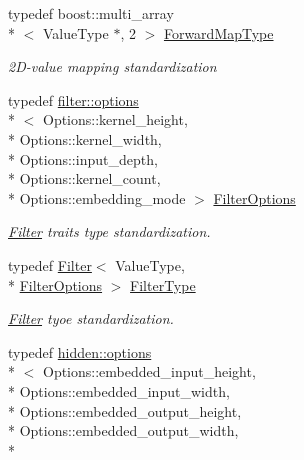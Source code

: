 \begin{DoxyCompactItemize}
\item 
typedef boost\-::multi\-\_\-array\\*
$<$ Value\-Type $\ast$, 2 $>$ \hyperlink{structffnn_1_1layer_1_1convolution_1_1extrinsics_abda7b16eb793b1b130063d51ef701296}{Forward\-Map\-Type}
\begin{DoxyCompactList}\small\item\em 2\-D-\/value mapping standardization \end{DoxyCompactList}\item 
typedef \hyperlink{structffnn_1_1layer_1_1convolution_1_1filter_1_1options}{filter\-::options}\\*
$<$ Options\-::kernel\-\_\-height, \\*
Options\-::kernel\-\_\-width, \\*
Options\-::input\-\_\-depth, \\*
Options\-::kernel\-\_\-count, \\*
Options\-::embedding\-\_\-mode $>$ \hyperlink{structffnn_1_1layer_1_1convolution_1_1extrinsics_a0de5368aa5d42881cfd7406cc2762bc5}{Filter\-Options}
\begin{DoxyCompactList}\small\item\em \hyperlink{structffnn_1_1layer_1_1convolution_1_1_filter}{Filter} traits type standardization. \end{DoxyCompactList}\item 
typedef \hyperlink{structffnn_1_1layer_1_1convolution_1_1_filter}{Filter}$<$ Value\-Type, \\*
\hyperlink{structffnn_1_1layer_1_1convolution_1_1extrinsics_a0de5368aa5d42881cfd7406cc2762bc5}{Filter\-Options} $>$ \hyperlink{structffnn_1_1layer_1_1convolution_1_1extrinsics_a3e02025b65ed127949b68053776507c8}{Filter\-Type}
\begin{DoxyCompactList}\small\item\em \hyperlink{structffnn_1_1layer_1_1convolution_1_1_filter}{Filter} tyoe standardization. \end{DoxyCompactList}\item 
typedef \hyperlink{structffnn_1_1layer_1_1hidden_1_1options}{hidden\-::options}\\*
$<$ Options\-::embedded\-\_\-input\-\_\-height, \\*
Options\-::embedded\-\_\-input\-\_\-width, \\*
Options\-::embedded\-\_\-output\-\_\-height, \\*
Options\-::embedded\-\_\-output\-\_\-width, \\*

\end{DoxyCompactItemize}
